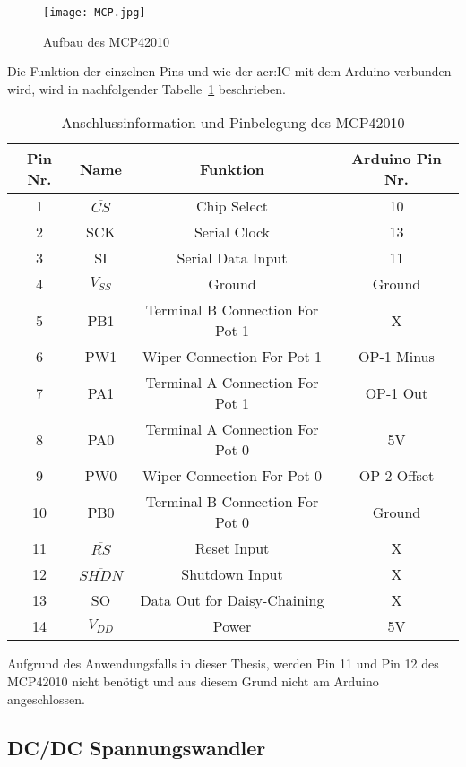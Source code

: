 \begin{figure}[H]
	\centering
	\texttt{[image: MCP.jpg]}
	\caption[Aufbau des MCP42010]{Aufbau des MCP42010} 
	\cite{MCP42}
	\label{fig:MCP}
\end{figure}

Die Funktion der einzelnen Pins und wie der \gls{acr:IC} mit dem Arduino verbunden wird, wird in nachfolgender Tabelle~\ref{tab:pinmcp} beschrieben. 

\begin{table}[htb]
	\begin{center}
		\begin{tabular}[H]{cccc}	
			\toprule
			\textbf{Pin Nr.} & \textbf{Name}  &\textbf{Funktion} & \textbf{Arduino Pin Nr.} \\
			\midrule
			1 & $\overline{CS}$ & Chip Select &  10 \\
			2 & SCK & Serial Clock &  13 \\
			3 & SI & Serial Data Input&  11 \\
			4 & $V_{SS}$ & Ground &  Ground \\
			5 & PB1 & Terminal B Connection For Pot 1 & X \\
			6 & PW1 & Wiper Connection For Pot 1 &  OP-1 Minus \\
			7 & PA1& Terminal A Connection For Pot 1 &  OP-1 Out  \\
			8 & PA0& Terminal A Connection For Pot 0 &  5V \\
			9 & PW0& Wiper Connection For Pot 0 & OP-2 Offset \\
			10 & PB0 & Terminal B Connection For Pot 0 &  Ground \\
			11 & $\overline{RS}$ & Reset Input & X  \\
			12 & $\overline{SHDN}$ & Shutdown Input &X\\
			13 & SO & Data Out for Daisy-Chaining & X \\
			14 & $V_{DD}$ & Power & 5V \\
			\bottomrule
		\end{tabular}
		\caption{Anschlussinformation und Pinbelegung des MCP42010}
		\label{tab:pinmcp}
	\end{center}
\end{table}

Aufgrund des Anwendungsfalls in dieser Thesis, werden Pin 11 und Pin 12 des MCP42010 nicht benötigt und aus diesem Grund nicht am Arduino angeschlossen. 

\subsection{DC/DC Spannungswandler}
\label{subsec:dcdc}

